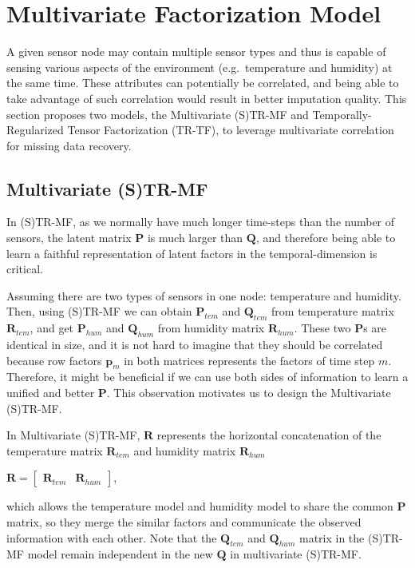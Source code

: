 
\section{Multivariate Factorization Model} \label{sec:tf}
A given sensor node may contain multiple sensor types and thus is capable of sensing various aspects of the environment (e.g.\ temperature and humidity) at the same time.
These attributes can potentially be correlated, and being able to take advantage of such correlation would result in better imputation quality.
This section proposes two models, the Multivariate (S)TR-MF and Temporally-Regularized Tensor Factorization (TR-TF), to leverage multivariate correlation for missing data recovery.

\subsection{Multivariate (S)TR-MF} %
In (S)TR-MF, as we normally have much longer time-steps than the number of sensors, the latent matrix $\mathbf{P}$ is much larger than $\mathbf{Q}$, and therefore being able to learn a faithful representation of latent factors in the temporal-dimension is critical. 

Assuming there are two types of sensors in one node: temperature and humidity. Then, using (S)TR-MF we can obtain $\mathbf{P}_{tem}$ and $\mathbf{Q}_{tem}$ from temperature matrix $\mathbf{R}_{tem}$, and get $\mathbf{P}_{hum}$ and $\mathbf{Q}_{hum}$ from humidity matrix $\mathbf{R}_{hum}$. These two $\mathbf{P}$s are identical in size, and it is not hard to imagine that they should be correlated because row factors $\mathbf{p}_m$ in both matrices represents the factors of time step $m$. Therefore, it might be beneficial if we can use both sides of information to learn a unified and better $\mathbf{P}$.
This observation motivates us to design the Multivariate (S)TR-MF.

In Multivariate (S)TR-MF, $\mathbf{R}$ represents the horizontal concatenation of the temperature matrix $\mathbf{R}_{tem}$ and humidity matrix $\mathbf{R}_{hum}$

\begin{center}
 $\mathbf{R} = \begin{bmatrix}\mathbf{R}_{tem} & \mathbf{R}_{hum} \end{bmatrix}$,
\end{center} 
which allows the temperature model and humidity model to share the common $\mathbf{P}$ matrix, so they merge the similar factors and communicate the observed information with each other. Note that the $\mathbf{Q}_{tem}$ and $\mathbf{Q}_{hum}$ matrix in the (S)TR-MF model remain independent in the new $\mathbf{Q}$ in multivariate (S)TR-MF.

